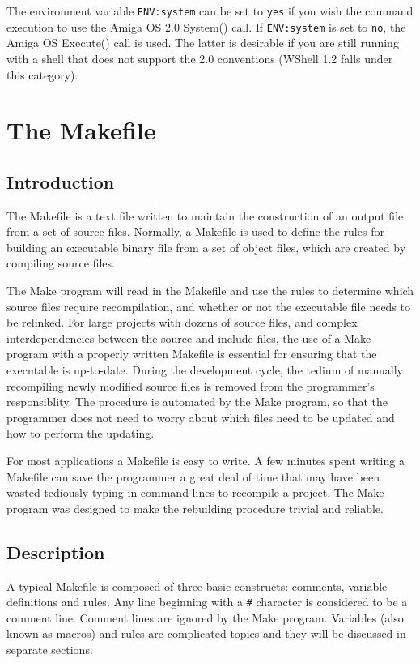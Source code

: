 The environment variable {\tt ENV:system} can be set to {\tt yes} if you
wish the command execution to use the Amiga OS 2.0 System() call.  If
{\tt ENV:system} is set to {\tt no}, the Amiga OS Execute() call is used.
The latter is desirable if you are still running with a shell that does not
support the 2.0 conventions (WShell 1.2 falls under this category).


\chapter{The Makefile}

\section{Introduction}

The Makefile is a text file written to maintain the construction of an
output file from a set of source files.  Normally, a Makefile is used to
define the rules for building an executable binary file from a set of
object files, which are created by compiling source files.

The Make program will read in the Makefile and use the rules to determine
which source files require recompilation, and whether or not the executable
file needs to be relinked.  For large projects with dozens of source files,
and complex interdependencies between the source and include files, the use
of a Make program with a properly written Makefile is essential for
ensuring that the executable is up-to-date.  During the development cycle,
the tedium of manually recompiling newly modified source files is removed
from the programmer's responsiblity.  The procedure is automated by the
Make program, so that the programmer does not need to worry about which
files need to be updated and how to perform the updating.

For most applications a Makefile is easy to write.  A few minutes spent
writing a Makefile can save the programmer a great deal of time that may
have been wasted tediously typing in command lines to recompile a project.
The Make program was designed to make the rebuilding procedure trivial and
reliable.

\section{Description}

A typical Makefile is composed of three basic constructs:  comments,
variable definitions and rules.  Any line beginning with a {\tt \#}
character is considered to be a comment line.  Comment lines are ignored by
the Make program.  Variables (also known as macros) and rules are
complicated topics and they will be discussed in separate sections.

